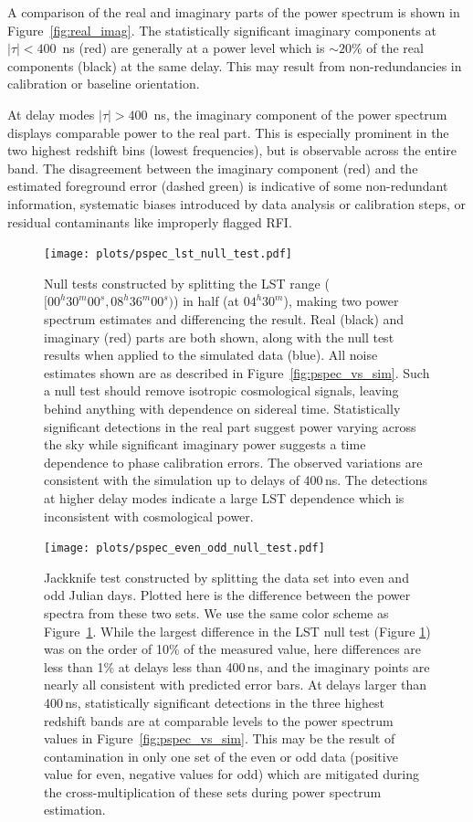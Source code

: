 A comparison of the real and imaginary parts of the power spectrum
is shown in Figure~\ref{fig:real_imag}.
The statistically significant imaginary components at
$ |\tau| < 400 $~ns (red) are generally at a power level
which is $ \sim 20\% $ of the real components (black) at the same delay.
This may result from non-redundancies in calibration or baseline orientation.

At delay modes $ |\tau| > 400 $~ns, the imaginary
component of the power spectrum displays comparable power to the 
real part. This is especially prominent in the two highest redshift bins (lowest frequencies), but is observable across the entire band.
The disagreement between the imaginary component (red) and the estimated foreground error (dashed green) is indicative of some non-redundant information, systematic biases introduced by data analysis or calibration steps, or residual contaminants like improperly flagged RFI.

\begin{figure}[tp]
\centering
\texttt{[image: plots/pspec\_lst\_null\_test.pdf]}
\caption{Null tests constructed by splitting the LST range ($[00^{h}30^{m}00^{s}, 08^{h}36^{m}00^{s}) $) in half (at $04^{h}30^{m}$), making two
power spectrum estimates and differencing the result. Real (black) and imaginary (red) parts are both shown, along with the null test results
when applied to the simulated data (blue). All noise estimates shown are as described in Figure~\ref{fig:pspec_vs_sim}.
Such a null test should remove
isotropic cosmological signals, leaving behind anything with dependence on sidereal time. Statistically significant detections in the real part suggest power varying across the sky while significant imaginary power suggests a time dependence to phase calibration errors. The observed variations are consistent with the simulation up to delays of 400\,ns.
The detections at higher delay modes indicate a large 
LST dependence which is inconsistent with cosmological power.}
\label{fig:lst_null_test}
\end{figure}

\begin{figure}[tp]
\centering
\texttt{[image: plots/pspec\_even\_odd\_null\_test.pdf]}
\caption{Jackknife test constructed by splitting the data set into even and odd Julian days. Plotted here is the difference between the power spectra from these two sets. We use the same color scheme as Figure~\ref{fig:lst_null_test}. While the largest difference in the LST null test
(Figure \ref{fig:lst_null_test}) was on the order of 10\% of the measured value, here differences are less than 1\% at delays less than 400\,ns, and the imaginary points are nearly all consistent with predicted error bars. At delays larger than 400\,ns, statistically significant detections
in the three highest redshift bands are at comparable
levels to the power spectrum values in Figure~\ref{fig:pspec_vs_sim}.
This may be the result of contamination in only one set of the even or odd data (positive value for even, negative values for odd) which are mitigated during the cross-multiplication of these sets during power spectrum estimation.}
\label{fig:even_odd_null_test}
\end{figure}

